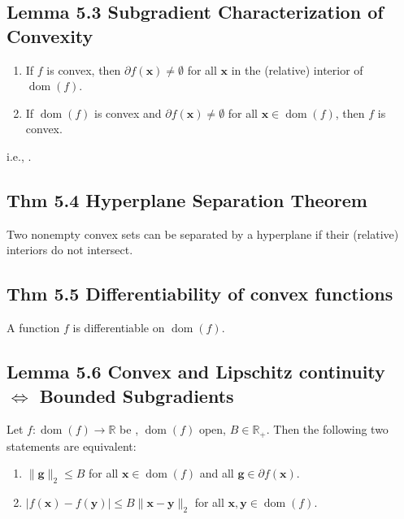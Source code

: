 \subsection*{Lemma 5.3 Subgradient Characterization of Convexity}
\begin{enumerate}[label = (\roman*), leftmargin=*]
    \item If $f$ is convex, then $\partial f(\mathbf{x}) \neq \emptyset$ for all $\mathbf{x}$ in the (relative) interior of $\operatorname{dom}(f)$.
    \item If $\operatorname{dom}(f)$ is convex and $\partial f(\mathbf{x}) \neq \emptyset$ for all $\mathbf{x} \in \operatorname{dom}(f)$, then $f$ is convex.
\end{enumerate}
i.e., .





\subsection*{Thm 5.4 Hyperplane Separation Theorem}
Two nonempty convex sets can be separated by a hyperplane if their (relative) interiors do not intersect.



\subsection*{Thm 5.5 Differentiability of convex functions}
A  function $f$ is differentiable  on $\operatorname{dom}(f)$.




\subsection*{Lemma 5.6 Convex and Lipschitz continuity $\iff$ Bounded Subgradients}
Let $f: \operatorname{dom}(f) \rightarrow \mathbb{R}$ be , $\operatorname{dom}(f)$ open, $B \in \mathbb{R}_{+}$. Then the following two statements are equivalent:
\begin{enumerate}[label = (\roman*), leftmargin=*]
    \item $\|\mathbf{g}\|_{2} \leq B$ for all $\mathbf{x} \in \operatorname{dom}(f)$ and all $\mathbf{g} \in \partial f(\mathbf{x})$.
    \item $|f(\mathbf{x})-f(\mathbf{y})| \leq B\|\mathbf{x}-\mathbf{y}\|_{2}$ for all $\mathbf{x}, \mathbf{y} \in \operatorname{dom}(f)$.
\end{enumerate}

